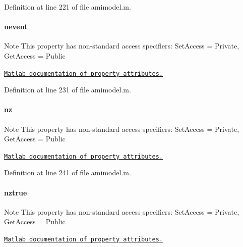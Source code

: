 Definition at line 221 of file amimodel.\+m.

\hypertarget{classamimodel_aab5c7f06273122b68624eb3bca6a9b6e}{}
\paragraph[{nevent}]{\setlength{\rightskip}{0pt plus 5cm}nevent}\label{classamimodel_aab5c7f06273122b68624eb3bca6a9b6e}
\begin{DoxyNote}{Note}
This property has non-\/standard access specifiers\+: {\ttfamily Set\+Access = Private, Get\+Access = Public} 

\href{http://www.mathworks.com/help/matlab/matlab_oop/property-attributes.html}{\tt Matlab documentation of property attributes.} 
\end{DoxyNote}


Definition at line 231 of file amimodel.\+m.

\hypertarget{classamimodel_a79f11413e5bfe18a0e71e17574399ad5}{}
\paragraph[{nz}]{\setlength{\rightskip}{0pt plus 5cm}nz}\label{classamimodel_a79f11413e5bfe18a0e71e17574399ad5}
\begin{DoxyNote}{Note}
This property has non-\/standard access specifiers\+: {\ttfamily Set\+Access = Private, Get\+Access = Public} 

\href{http://www.mathworks.com/help/matlab/matlab_oop/property-attributes.html}{\tt Matlab documentation of property attributes.} 
\end{DoxyNote}


Definition at line 241 of file amimodel.\+m.

\hypertarget{classamimodel_a364ecd990baeeefd1de3e6795cd50a58}{}
\paragraph[{nztrue}]{\setlength{\rightskip}{0pt plus 5cm}nztrue}\label{classamimodel_a364ecd990baeeefd1de3e6795cd50a58}
\begin{DoxyNote}{Note}
This property has non-\/standard access specifiers\+: {\ttfamily Set\+Access = Private, Get\+Access = Public} 

\href{http://www.mathworks.com/help/matlab/matlab_oop/property-attributes.html}{\tt Matlab documentation of property attributes.} 
\end{DoxyNote}


